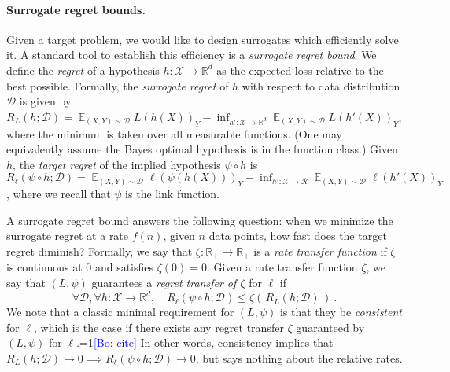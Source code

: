 \documentclass{article}
\theoremstyle{definition}\newtheorem{definition}{Definition}
\theoremstyle{definition}\newtheorem{assumption}{Assumption}
\newcommand{\Comments}{1}
\newcommand{\mynote}[2]{\ifnum\Comments=1\textcolor{#1}{#2}\fi}
\newcommand{\bo}[1]{\mynote{blue}{[Bo: #1]}}
\newcommand{\reals}{\mathbb{R}}
\newcommand{\D}{\mathcal{D}}
\DeclareMathOperator{\E}{\mathbb{E}}  %
\newcommand{\R}{\mathcal{R}}
\newcommand{\X}{\mathcal{X}}
\begin{document}
\paragraph{Surrogate regret bounds.}
Given a target problem, we would like to design surrogates which efficiently solve it.
A standard tool to establish this efficiency is a \emph{surrogate regret bound}.
We define the \emph{regret} of a hypothesis $h: \X \to \reals^d$ as the expected loss relative to the best possible.
Formally, the \emph{surrogate regret} of $h$ with respect to data distribution $\D$ is given by $R_L(h;\D) = \E_{(X,Y)\sim\D} L(h(X))_Y - \inf_{h':\X\to\reals^d} \E_{(X,Y)\sim\D} L(h'(X))_Y$, where the minimum is taken over all measurable functions.
(One may equivalently assume the Bayes optimal hypothesis is in the function class.)
Given $h$, the \emph{target regret} of the implied hypothesis $\psi \circ h$ is $R_\ell(\psi\circ h;\D) = \E_{(X,Y)\sim\D} \ell(\psi(h(X)))_Y - \inf_{h':\X\to\R} \E_{(X,Y)\sim\D} \ell(h'(X))_Y$, where we recall that $\psi$ is the link function.


A surrogate regret bound answers the following question: when we minimize the surrogate regret at a rate $f(n)$, given $n$ data points, how fast does the target regret diminish?
Formally, we say that $\zeta : \reals_+ \to \reals_+$ is a \emph{rate transfer function} if $\zeta$ is continuous at $0$ and satisfies $\zeta(0) = 0$.
Given a rate transfer function $\zeta$, we say that $(L,\psi)$ guarantees a \emph{regret transfer of $\zeta$} for $\ell$ if
\begin{equation}
  \label{eq:surrogate-regret-bound}
  \forall \D, \forall h:\X\to\reals^d, \quad R_\ell(\psi\circ h;\D) \leq \zeta(\, R_L(h;\D) \,)~.
\end{equation}
We note that a classic minimal requirement for $(L,\psi)$ is that they be \emph{consistent} for $\ell$, which is the case if there exists any regret transfer $\zeta$ guaranteed by $(L,\psi)$ for $\ell$.\bo{cite}
In other words, consistency implies that $R_L(h;\D) \to 0 \implies R_{\ell}(\psi \circ h;\D) \to 0$, but says nothing about the relative rates.
\end{document}
